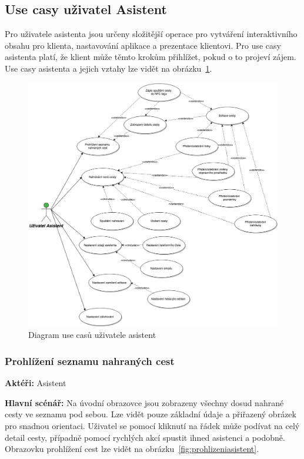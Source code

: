 \documentclass{article}
\newcommand{\usecase}[2]{\subsubsection{#1}\label{#2}}
\begin{document}
\subsection{Use casy uživatel Asistent}
Pro uživatele asistenta jsou určeny složitější operace pro vytváření interaktivního obsahu pro klienta,
nastavování aplikace a prezentace klientovi. Pro use casy asistenta platí, že klient může těmto
krokům přihlížet, pokud o to projeví zájem. Use casy asistenta a jejich vztahy lze vidět na obrázku~\ref{fig:UseCasesAsistant}.

\begin{figure}[H]
        \centering
                \includegraphics[scale=0.2]{img/UseCasesAsistant.png}
        \caption{Diagram use casů uživatele asistent}
        \label{fig:UseCasesAsistant}
\end{figure}

\usecase{Prohlížení seznamu nahraných cest}{prohlizeniasistent}
\textbf{Aktéři:} Asistent

\vspace{0.1cm}
\noindent
\textbf{Hlavní scénář:} Na úvodní obrazovce jsou zobrazeny všechny dosud nahrané cesty ve seznamu pod sebou.
Lze vidět pouze základní údaje a přiřazený obrázek pro snadnou orientaci. Uživatel se pomocí
kliknutí na řádek může podívat na celý detail cesty, případně pomocí rychlých akcí spustit ihned asistenci
a podobně. Obrazovku prohlížení cest lze vidět na obrázku~\ref{fig:prohlizeniasistent}.
\end{document}
